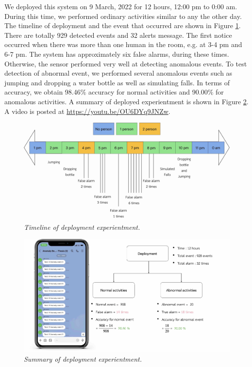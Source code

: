 We deployed this system on 9 March, 2022 for 12 hours, 12:00 pm to 0:00 am. During this time, we performed ordinary activities similar to any the other day. The timeline of deployment and the event that occurred are shown in Figure \ref{fig:timelinedeploy}. There are totally 929 detected events and 32 alerts message. The first notice occurred when there was more than one human in the room, e.g. at 3-4 pm and 6-7 pm. The system has approximately six false alarms, during these times. Otherwise, the sensor performed very well at detecting anomalous events. To test detection of abnormal event, we performed several anomalous events such as jumping and dropping a water bottle as well as simulating falls. In terms of accuracy, we obtain 98.46$\%$ accuracy for normal activities and 90.00$\%$ for anomalous activities. A summary of deployed experientment is shown in Figure \ref{fig:summarydeploy}. A video is posted at \url{https://youtu.be/OU6DYq9JNZw}.

\begin{figure}[H]
  \centering
  \caption[Timeline of deployment experientment.]{\emph{Timeline of deployment experientment.}}  \label{fig:timelinedeploy}
  \includegraphics[scale = 0.13]{figures/timelinedeployment.jpg}
\end{figure}

\begin{figure}[H]
  \centering
  \caption[Summary of deployment experientment.]{\emph{Summary of deployment experientment.}} \label{fig:summarydeploy}
  \includegraphics[scale = 0.13]{figures/summarydeployment.jpg}
\end{figure}

\FloatBarrier